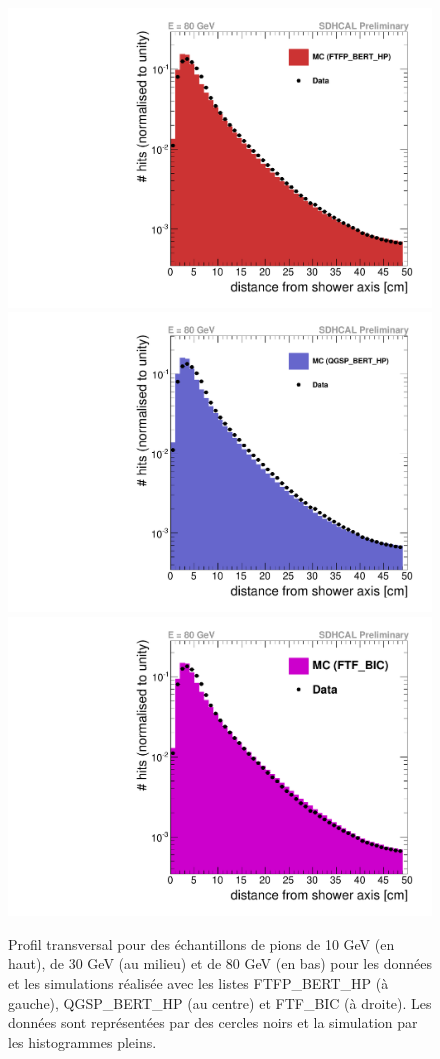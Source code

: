 \begin{subappendices}
\begin{figure}[!ht]
  \includegraphics[width=.32\textwidth]{Shower/figs/radProfLog_pi-_80GeV_ftfp_bert_hp.pdf}
  \includegraphics[width=.32\textwidth]{Shower/figs/radProfLog_pi-_80GeV_qgsp_bert_hp.pdf}
  \includegraphics[width=.32\textwidth]{Shower/figs/radProfLog_pi-_80GeV_ftf_bic.pdf}
  \caption{Profil transversal pour des échantillons de pions de 10 GeV (en haut), de 30 GeV (au milieu) et de 80 GeV (en bas) pour les données et les simulations réalisée avec les listes FTFP\_BERT\_HP (à gauche), QGSP\_BERT\_HP (au centre) et FTF\_BIC (à droite). Les données sont représentées par des cercles noirs et la simulation par les histogrammes pleins. \label{fig.pi-radial_log}}
\end{figure}
\end{subappendices}

%
